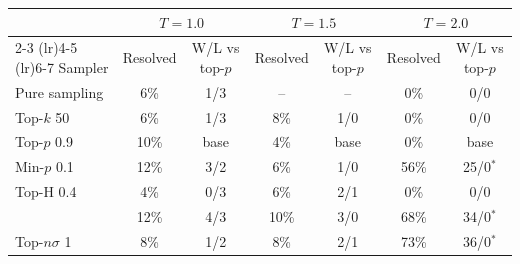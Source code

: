 \begin{tabular}{lcccccc}
\toprule
 & \multicolumn{2}{c}{$T{=}1.0$} & \multicolumn{2}{c}{$T{=}1.5$} & \multicolumn{2}{c}{$T{=}2.0$} \\
\cmidrule(lr){2-3} \cmidrule(lr){4-5} \cmidrule(lr){6-7}
Sampler & Resolved & W/L vs top-$p$ & Resolved & W/L vs top-$p$ & Resolved & W/L vs top-$p$ \\
\midrule
Pure sampling & 6\% & 1/3 & -- & -- & 0\% & 0/0 \\
Top-$k$ 50 & 6\% & 1/3 & 8\% & 1/0 & 0\% & 0/0 \\
Top-$p$ 0.9 & 10\% & base & 4\% & base & 0\% & base \\
Min-$p$ 0.1 & 12\% & 3/2 & 6\% & 1/0 & 56\% & 25/0$^{*}$ \\
Top-H 0.4 & 4\% & 0/3 & 6\% & 2/1 & 0\% & 0/0 \\
\pless{} & 12\% & 4/3 & 10\% & 3/0 & 68\% & 34/0$^{*}$ \\
Top-$n\sigma$ 1 & 8\% & 1/2 & 8\% & 2/1 & 73\% & 36/0$^{*}$ \\
\bottomrule
\end{tabular}
